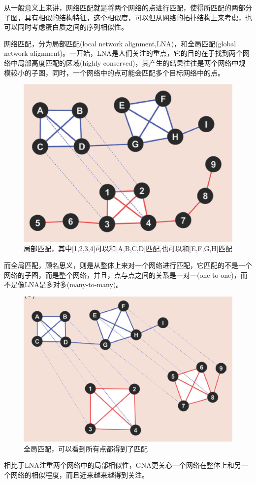 从一般意义上来讲，网络匹配就是将两个网络的点进行匹配，使得所匹配的两部分子图，具有相似的结构特征，这个相似度，可以但从网络的拓扑结构上来考虑，也可以同时考虑蛋白质之间的序列相似性。

网络匹配，分为局部匹配(local network alignment,LNA)，和全局匹配(global network alignment)。一开始，LNA是人们关注的重点，它的目的在于找到两个网络中局部高度匹配的区域(highly conserved)，其产生的结果往往是两个网络中规模较小的子图，同时，一个网络中的点可能会匹配多个目标网络中的点。

\begin{figure}[htbp]
\centering
\includegraphics[height=0.25\textheight]{pic/lna.png}
\captionsetup{margin=50pt}
\caption{局部匹配，其中[1,2,3,4]可以和[A,B,C,D]匹配,也可以和[E,F,G,H]匹配 \cite{atias2012comparative} \label{fig:lna}}
\end{figure}
而全局匹配，顾名思义，则是从整体上来对一个网络进行匹配，它匹配的不是一个网络的子图，而是整个网络，并且，点与点之间的关系是一对一(one-to-one)，而不是像LNA是多对多(many-to-many)。

\begin{figure}[htbp]
\centering
\includegraphics[height=0.25\textheight]{pic/gna.png}
\captionsetup{margin=50pt}
\caption{全局匹配，可以看到所有点都得到了匹配 \cite{atias2012comparative} \label{fig:gna}}
\end{figure}
相比于LNA注重两个网络中的局部相似性，GNA更关心一个网络在整体上和另一个网络的相似程度，而且近来越来越得到关注。

